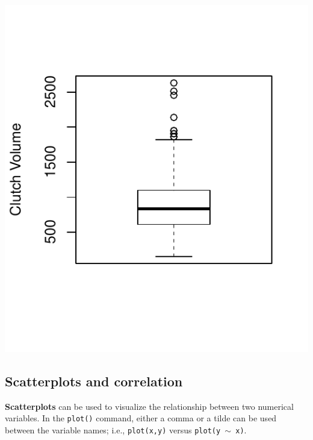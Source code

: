 \begin{centering}
\begin{knitrout}
\color{fgcolor}\begin{kframe}
\begin{alltt}
\hlstd{(} \hlopt{$}  \hlstd{=} \hlstd{,}  \hlstd{=} \hlstd{,}
         \hlstd{=} \hlopt{$}
\end{alltt}
\end{kframe}
\includegraphics[width=\maxwidth]{figure/unnamed-chunk-22-1} 

\end{knitrout}
\end{centering}

\subsection{Scatterplots and correlation}
\textbf{Scatterplots} can be used to visualize the relationship between two numerical variables. In the \texttt{plot()} command, either a comma or a tilde can be used between the variable names; i.e., \texttt{plot(x,y)} versus \texttt{plot(y $\sim$ x)}.

